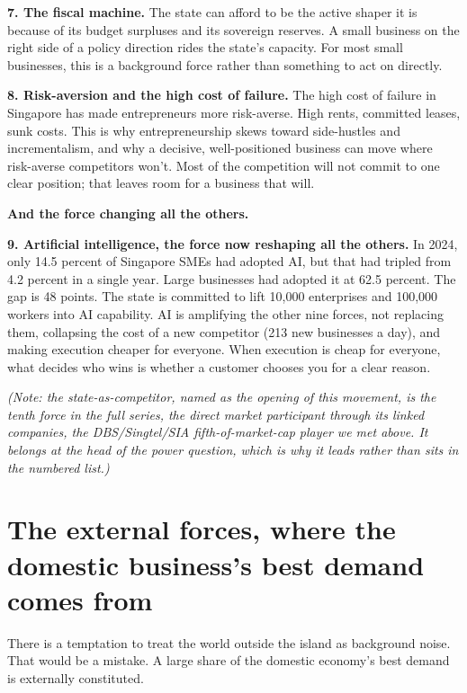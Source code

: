 \documentclass[10pt,twoside,openany]{memoir}
\newcommand{\needspacehead}{\needspace{4\baselineskip}}
\let\oldsection\section
\renewcommand{\section}{\needspacehead\oldsection}
\begin{document}
{{{{{{{{{{{\textbf{7. The fiscal machine.} The state can afford to be the active
shaper it is because of its budget surpluses and its sovereign reserves.
A small business on the right side of a policy direction rides the
state's capacity. For most small businesses, this is a background force
rather than something to act on directly.

\textbf{8. Risk-aversion and the high cost of failure.} The high cost of
failure in Singapore has made entrepreneurs more risk-averse. High
rents, committed leases, sunk costs. This is why entrepreneurship skews
toward side-hustles and incrementalism, and why a decisive,
well-positioned business can move where risk-averse competitors won't.
Most of the competition will not commit to one clear position; that
leaves room for a business that will.

\textbf{And the force changing all the others.}

\textbf{9. Artificial intelligence, the force now reshaping all the
others.} In 2024, only 14.5 percent of Singapore SMEs had adopted AI,
but that had tripled from 4.2 percent in a single year. Large businesses
had adopted it at 62.5 percent. The gap is 48 points. The state is
committed to lift 10,000 enterprises and 100,000 workers into AI
capability. AI is amplifying the other nine forces, not replacing them,
collapsing the cost of a new competitor (213 new businesses a day), and
making execution cheaper for everyone. When execution is cheap for
everyone, what decides who wins is whether a customer chooses you for a
clear reason.

\emph{(Note: the state-as-competitor, named as the opening of this
movement, is the tenth force in the full series, the direct market
participant through its linked companies, the DBS/Singtel/SIA
fifth-of-market-cap player we met above. It belongs at the head of the
power question, which is why it leads rather than sits in the numbered
list.)}

\section{The external forces, where the domestic business's best demand
comes
from}\label{the-external-forces-where-the-domestic-businesss-best-demand-comes-from}

There is a temptation to treat the world outside the island as
background noise. That would be a mistake. A large share of the domestic
economy's best demand is externally constituted.

}}}}}}}}}}}
\end{document}
